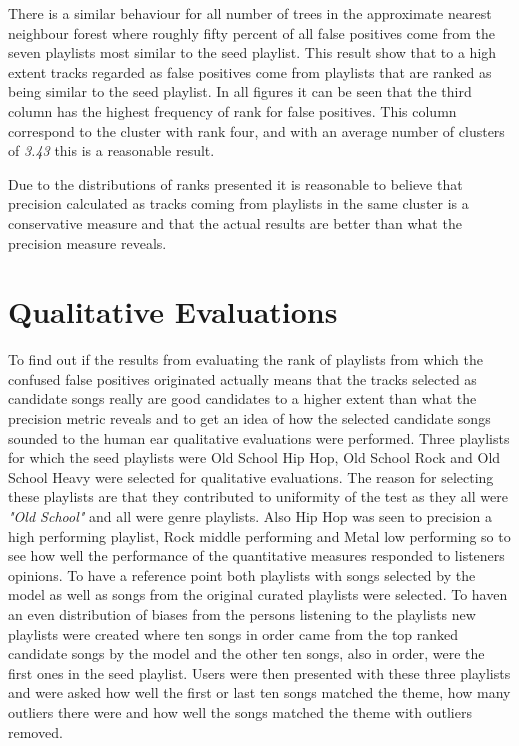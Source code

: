 \documentclass[a4paper,11pt]{kth-mag}
\begin{document}
There is a similar behaviour for all number of trees in the approximate nearest neighbour forest where roughly fifty percent of all false positives come from the seven playlists most similar to the seed playlist. This result show that to a high extent tracks regarded as false positives come from playlists that are ranked as being similar to the seed playlist. In all figures it can be seen that the third column has the highest frequency of rank for false positives. This column correspond to the cluster with rank four, and with an average number of clusters of \textit{3.43} this is a reasonable result. 

Due to the distributions of ranks presented it is reasonable to believe that precision calculated as tracks coming from playlists in the same cluster is a conservative measure and that the actual results are better than what the precision measure reveals.

\section{Qualitative Evaluations}
To find out if the results from evaluating the rank of playlists from which the confused false positives originated actually means that the tracks selected as candidate songs really are good candidates to a higher extent than what the precision metric reveals and to get an idea of how the selected candidate songs sounded to the human ear qualitative evaluations were performed. Three playlists for which the seed playlists were Old School Hip Hop, Old School Rock and Old School Heavy were selected for qualitative evaluations. The reason for selecting these playlists are that they contributed to uniformity of the test as they all were \textit{"Old School"} and all were genre playlists. Also Hip Hop was seen to precision a high performing playlist, Rock middle performing and Metal low performing so to see how well the performance of the quantitative measures responded to listeners opinions. To have a reference point both playlists with songs selected by the model as well as songs from the original curated playlists were selected. To haven an even distribution of biases from the persons listening to the playlists new playlists were created where ten songs in order came from the top ranked candidate songs by the model and the other ten songs, also in order, were the first ones in the seed playlist. Users were then presented with these three playlists and were asked how well the first or last ten songs matched the theme, how many outliers there were and how well the songs matched the theme with outliers removed.
\end{document}
